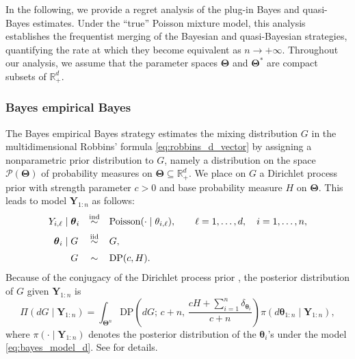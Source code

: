 \documentclass[twoside,12pt]{article}
\def\simind{\stackrel{\mbox{\scriptsize{ind}}}{\sim}}
\def\simiid{\stackrel{\mbox{\scriptsize{iid}}}{\sim}}
\begin{document}
In the following, we provide a regret analysis of the plug-in Bayes and quasi-Bayes estimates. Under the ``true'' Poisson mixture model, this analysis establishes the frequentist merging of the Bayesian and quasi-Bayesian strategies, quantifying the rate at which they become equivalent as $n\to+\infty$. Throughout our analysis, we assume that the parameter spaces $\boldsymbol{\Theta}$ and $\boldsymbol{\Theta}^{\ast}$ are compact subsets of $\mathbb R_+^d$.

\subsubsection{Bayes empirical Bayes}

The Bayes empirical Bayes strategy estimates the mixing distribution $G$ in the multidimensional Robbins' formula \eqref{eq:robbins_d_vector} by assigning a nonparametric prior distribution to $G$, namely a distribution on the space $\mathcal P(\boldsymbol\Theta)$ of probability measures on $\boldsymbol\Theta\subseteq\mathbb R_+^d$. We place on $G$ a Dirichlet process prior with strength parameter $c>0$ and base probability measure $H$ on $\boldsymbol\Theta$. This leads to model $\boldsymbol Y_{1:n}$ as follows:
\begin{equation}\label{eq:bayes_model_d}
\begin{array}{r@{\;}c@{\;}l@{\quad}c@{\quad}l}
Y_{i,\ell}& \mid &\boldsymbol\theta_i& \simind &\mathrm{Poisson}(\cdot\mid \theta_{i,\ell}),\qquad \ell=1,\ldots,d,\quad i=1,\ldots,n,\\[0.2cm]
\boldsymbol\theta_i& \mid &G& \simiid &G,\\[0.2cm]
&&G& \sim &\mathrm{DP}(c,H).
\end{array}
\end{equation}
Because of the conjugacy of the Dirichlet process prior \citep{Fer(73)}, the posterior distribution of $G$ given $\boldsymbol Y_{1:n}$ is
\begin{equation}\label{post_dp_d}\Pi(dG\mid \boldsymbol Y_{1:n})=\int_{\boldsymbol\Theta^n}\mathrm{DP}\left(dG;\,c+n,\,\frac{cH+\sum_{i=1}^n\delta_{\boldsymbol\theta_i}}{c+n}\right)\pi(d\boldsymbol\theta_{1:n}\mid \boldsymbol Y_{1:n}),
\end{equation}
where \(\pi(\cdot\mid \boldsymbol Y_{1:n})\) denotes the posterior distribution of the \(\boldsymbol\theta_i\)'s under the model \eqref{eq:bayes_model_d}. See \citet{Lo(84)} for details.
\end{document}
